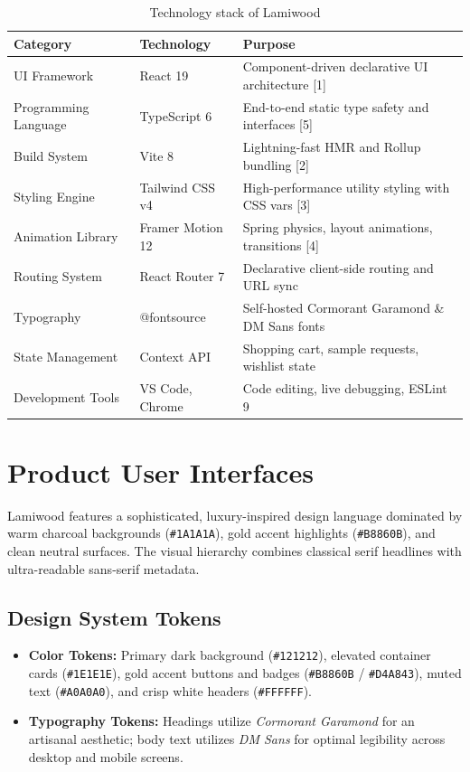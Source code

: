 \documentclass[12pt,a4paper]{report}
\begin{document}
\begin{table}[htbp]
\centering
\caption{Technology stack of Lamiwood}
\label{tab:tech_stack}
\begin{tabular}{lll}
\toprule
\textbf{Category} & \textbf{Technology} & \textbf{Purpose} \\
\midrule
UI Framework & React 19 & Component-driven declarative UI architecture [1] \\
Programming Language & TypeScript 6 & End-to-end static type safety and interfaces [5] \\
Build System & Vite 8 & Lightning-fast HMR and Rollup bundling [2] \\
Styling Engine & Tailwind CSS v4 & High-performance utility styling with CSS vars [3] \\
Animation Library & Framer Motion 12 & Spring physics, layout animations, transitions [4] \\
Routing System & React Router 7 & Declarative client-side routing and URL sync \\
Typography & @fontsource & Self-hosted Cormorant Garamond \& DM Sans fonts \\
State Management & Context API & Shopping cart, sample requests, wishlist state \\
Development Tools & VS Code, Chrome & Code editing, live debugging, ESLint 9 \\
\bottomrule
\end{tabular}
\end{table}

\section{Product User Interfaces}
Lamiwood features a sophisticated, luxury-inspired design language dominated by warm charcoal backgrounds (\texttt{\#1A1A1A}), gold accent highlights (\texttt{\#B8860B}), and clean neutral surfaces. The visual hierarchy combines classical serif headlines with ultra-readable sans-serif metadata.

\subsection{Design System Tokens}
\begin{itemize}
    \item \textbf{Color Tokens:} Primary dark background (\texttt{\#121212}), elevated container cards (\texttt{\#1E1E1E}), gold accent buttons and badges (\texttt{\#B8860B} / \texttt{\#D4A843}), muted text (\texttt{\#A0A0A0}), and crisp white headers (\texttt{\#FFFFFF}).
    \item \textbf{Typography Tokens:} Headings utilize \textit{Cormorant Garamond} for an artisanal aesthetic; body text utilizes \textit{DM Sans} for optimal legibility across desktop and mobile screens.
\end{itemize}
\end{document}
